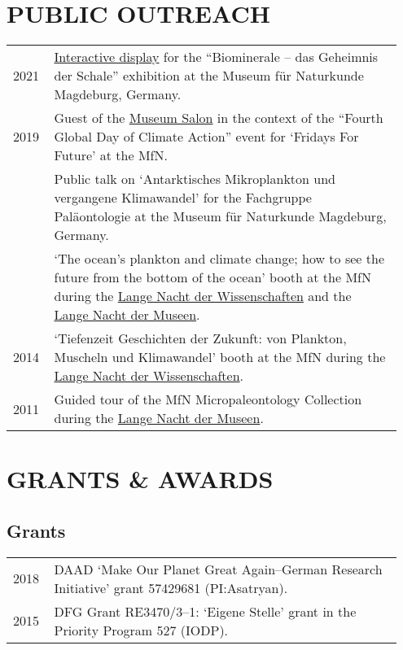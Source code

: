 \documentclass[11pt, a4paper]{article}
\begin{document}
\section{PUBLIC OUTREACH}
\begin{longtable}{@{}p{0.1\linewidth} P{0.85\linewidth}@{}}
2021 & \href{https://github.com/plannapus/raup_model}{Interactive display} for the ``Biominerale -- das Geheimnis der Schale'' exhibition at the Museum f\"{u}r Naturkunde Magdeburg, Germany.\\
2019 & Guest of the \href{https://www.museumfuernaturkunde.berlin/de/museum/veranstaltungen/aktionstag-zum-globalen-klimastreik-0}{Museum Salon} in the context of the ``Fourth Global Day of Climate Action'' event for `Fridays For Future' at the MfN.\\
 & Public talk on `Antarktisches Mikroplankton und vergangene Klimawandel' for the Fachgruppe Pal\"{a}ontologie at the Museum f\"{u}r Naturkunde Magdeburg, Germany.\\
 & `The ocean’s plankton and climate change; how to see the future from the bottom of the ocean' booth at the MfN during the \href{http://www.langenachtderwissenschaften.de/}{Lange Nacht der Wissenschaften} and the \href{http://www.lange-nacht-der-museen.de/}{Lange Nacht der Museen}.\\
2014 & `Tiefenzeit Geschichten der Zukunft: von Plankton, Muscheln und Klimawandel' booth at the MfN during the \href{http://www.langenachtderwissenschaften.de/}{Lange Nacht der Wissenschaften}.\\
2011 & Guided tour of the MfN Micropaleontology Collection during the \href{http://www.lange-nacht-der-museen.de/}{Lange Nacht der Museen}.\\
\end{longtable}

\section{GRANTS \& AWARDS}
\subsection{Grants}
\begin{longtable}{@{}p{0.1\linewidth} P{0.85\linewidth}@{}}
2018 & DAAD `Make Our Planet Great Again--German Research Initiative' grant 57429681 (PI:Asatryan).\\
2015 & DFG Grant RE3470/3--1: `Eigene Stelle' grant in the Priority Program 527 (IODP).\\
\end{longtable}
\end{document}
